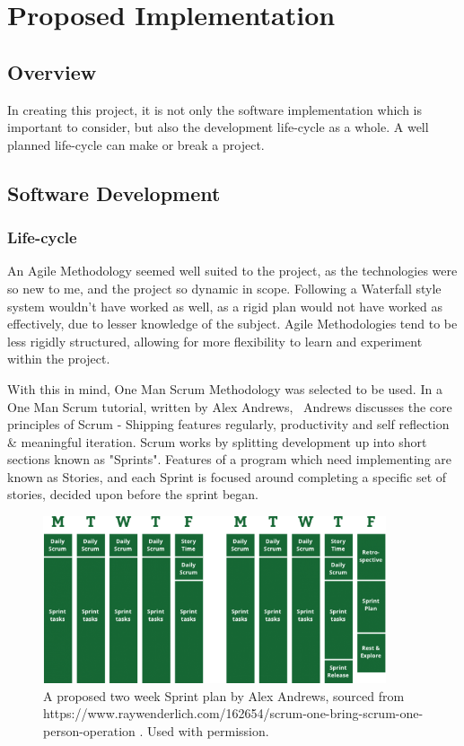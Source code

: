 \documentclass[a4paper,10pt]{report}
\begin{document}
\section{Proposed Implementation}
\subsection{Overview}

In creating this project, it is not only the software implementation which is important to consider, but also the development life-cycle as a whole. A well planned life-cycle can make or break a project. 

\subsection{Software Development}
\subsubsection{Life-cycle}

An Agile Methodology seemed well suited to the project, as the technologies were so new to me, and the project so dynamic in scope. Following a Waterfall style system wouldn't have worked as well, as a rigid plan would not have worked as effectively, due to lesser knowledge of the subject. Agile Methodologies tend to be less rigidly structured, allowing for more flexibility to learn and experiment within the project. \medskip

With this in mind, One Man Scrum Methodology was selected to be used. In a One Man Scrum tutorial, written by Alex Andrews,~\cite{andrews_2017} Andrews discusses the core principles of Scrum - Shipping features regularly, productivity and self reflection \& meaningful iteration. Scrum works by splitting development up into short sections known as "Sprints". Features of a program which need implementing are known as Stories, and each Sprint is focused around completing a specific set of stories, decided upon before the sprint began. \medskip

\begin{figure}[h!]
    \centering
  \includegraphics[width=0.9\textwidth]{RayWenderlich}
 \caption{A proposed two week Sprint plan by Alex Andrews, sourced from https://www.raywenderlich.com/162654/scrum-one-bring-scrum-one-person-operation . Used with permission.}
 \label{fig:two_week_sprint_plan}
\end{figure}
\end{document}
